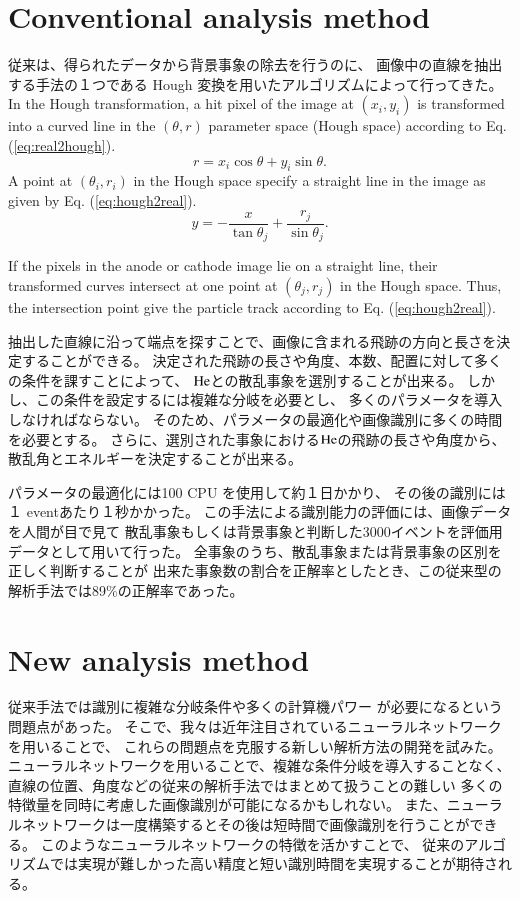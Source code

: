 \documentclass{jps-cp}
\begin{document}
\section{Conventional analysis method}
従来は、得られたデータから背景事象の除去を行うのに、
画像中の直線を抽出する手法の１つである
Hough 変換を用いたアルゴリズムによって行ってきた。
In the Hough transformation, a hit pixel of the image at $(x_{i}, y_{i})$ is transformed into
a curved line in the $(\theta, r)$ parameter space (Hough space)
according to Eq. (\ref{eq:real2hough}).
\begin{equation}
  \label{eq:real2hough}
  r = x_{i}\cos\theta+y_{i}\sin\theta. 
\end{equation}
A point at $(\theta_{i}, r_{i})$ in the Hough space specify a straight line
in the image as given by Eq. (\ref{eq:hough2real}).
\begin{equation}
  \label{eq:hough2real}
  y = -\frac{x}{\tan\theta_{j}}+\frac{r_{j}}{\sin\theta_{j}}. 
\end{equation}

If the pixels in the anode or cathode image lie on a straight line,
their transformed curves intersect at one point at $(\theta_{j}, r_{j})$ in the Hough space.
Thus, the intersection point give the particle track according to Eq. (\ref{eq:hough2real}).

抽出した直線に沿って端点を探すことで、画像に含まれる飛跡の方向と長さを決定することができる。
決定された飛跡の長さや角度、本数、配置に対して多くの条件を課すことによって、
$\rm{He}$との散乱事象を選別することが出来る。
しかし、この条件を設定するには複雑な分岐を必要とし、
多くのパラメータを導入しなければならない。
そのため、パラメータの最適化や画像識別に多くの時間を必要とする。
さらに、選別された事象における$\rm{He}$の飛跡の長さや角度から、
散乱角とエネルギーを決定することが出来る。

パラメータの最適化には100 CPU を使用して約１日かかり、
その後の識別には１ eventあたり１秒かかった。
この手法による識別能力の評価には、画像データを人間が目で見て
散乱事象もしくは背景事象と判断した3000イベントを評価用データとして用いて行った。
全事象のうち、散乱事象または背景事象の区別を正しく判断することが
出来た事象数の割合を正解率としたとき、この従来型の解析手法では89\%の正解率であった。

\section{New analysis method}

従来手法では識別に複雑な分岐条件や多くの計算機パワー
が必要になるという問題点があった。
そこで、我々は近年注目されているニューラルネットワークを用いることで、
これらの問題点を克服する新しい解析方法の開発を試みた。
ニューラルネットワークを用いることで、複雑な条件分岐を導入することなく、
直線の位置、角度などの従来の解析手法ではまとめて扱うことの難しい
多くの特徴量を同時に考慮した画像識別が可能になるかもしれない。
また、ニューラルネットワークは一度構築するとその後は短時間で画像識別を行うことができる。
このようなニューラルネットワークの特徴を活かすことで、
従来のアルゴリズムでは実現が難しかった高い精度と短い識別時間を実現することが期待される。
\end{document}
